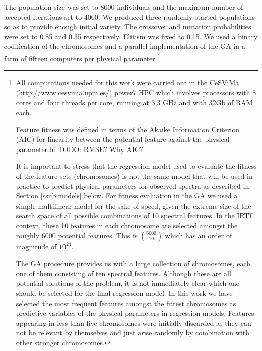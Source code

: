 The population size was set to 8000 individuals and the maximum number
of accepted iterations set to 4000. We produced three randomly started
populations so as to provide enough initial variety. The crossover and
mutation probabilities were set to 0.85 and 0.35 respectively. Elitism
was fixed to 0.15. We used a binary codification of the chromosomes
and a parallel implementation of the GA in a farm of fifteen computers
per physical parameter \footnote{All computations needed for this work
were carried out in the CeSViMa (http://www.cesvima.upm.es/) power7
HPC which involves processors with 8 cores and four threads per core,
running at 3,3 GHz and with 32Gb of RAM each.

Feature fitness was defined in terms of the Akaike Information
Criterion (AIC) for linearity between the potential feature against
the physical parameter.{bf TODO: RMSE? Why AIC?}  

It is important to stress that the regression model used to evaluate
the fitness of the feature sets (chromosomes) is not the same model
that will be used in practice to predict physical parameters for
observed spectra as described in Section \ref{ssub:models} below. For
fitness evaluation in the GA we used a simple multilinear model for
the sake of speed, given the extreme size of the search space of all
possible combinations of 10 spectral features. In the IRTF context,
these 10 features in each chromosome are selected amongst the roughly
6000 potential features. This is $\binom{6000}{10}$ which has an order
of magnitude of $10^{24}$. 

The GA procedure provides us with a large collection of chromosomes,
each one of them consisting of ten spectral features.  Although these
are all potential solutions of the problem, it is not immediately
clear which one should be selected for the final regression model. In
this work we have selected the most frequent features amongst the
fittest chromosomes as predictive variables of the physical parameters
in regression models. Features appearing in less than five chromosomes
were initially discarded as they can not be relevant by themselves and
just arise randomly by combination with other stronger chromosomes.

}
